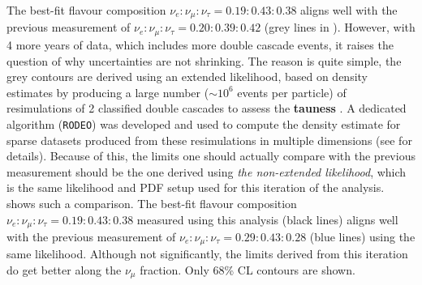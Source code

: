 The best-fit flavour composition $\nu_e:\nu_{\mu}:\nu_{\tau} = 0.19:0.43:0.38$ aligns well with the previous measurement  of $\nu_e:\nu_{\mu}:\nu_{\tau} = 0.20:0.39:0.42$ (grey lines in ). However, with 4 more years of data, which includes more double cascade events, it raises the question of why uncertainties are not shrinking. The reason is quite simple, the grey contours are derived using an extended likelihood, based on density estimates by producing a large number ($\sim10^6$ events per particle) of resimulations of 2 classified double cascades to assess the \textbf{tauness} . A dedicated algorithm (\texttt{RODEO}) was developed and used to compute the density estimate for sparse datasets produced from these resimulations in multiple dimensions (see  for details).  Because of this, the limits one should actually compare with the previous measurement should be the one derived using \emph{the non-extended likelihood}, which is the same likelihood and PDF setup used for this iteration of the analysis.  shows such a comparison. The best-fit flavour composition $\nu_e:\nu_{\mu}:\nu_{\tau} = 0.19:0.43:0.38$ measured using this analysis (black lines) aligns well with the previous measurement of $\nu_e:\nu_{\mu}:\nu_{\tau} = 0.29:0.43:0.28$ (blue lines) using the same likelihood. Although not significantly, the limits derived from this iteration do get better along the $\nu_{\mu}$ fraction. Only 68\% CL contours  are shown.

